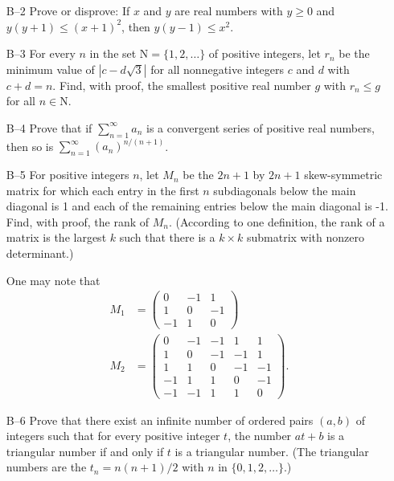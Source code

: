 \documentclass[amssymb,twocolumn,pra,10pt,aps]{revtex4-1}
\begin{document}
\begin{itemize}
\item[B--2]
Prove or disprove: If $x$ and $y$ are real numbers with $y\geq0$ and
$y(y+1) \leq (x+1)^2$, then $y(y-1)\leq x^2$.

\item[B--3]
For every $n$ in the set $\mathrm{N} = \{1,2,\dots \}$ of positive integers,
let $r_n$ be the minimum value of $|c-d\sqrt{3}|$ for all nonnegative
integers $c$ and $d$ with $c+d=n$. Find, with proof, the smallest
positive real number $g$ with $r_n \leq g$ for all $n \in \mathrm{N}$.

\item[B--4]
Prove that if $\sum_{n=1}^\infty a_n$ is a convergent series of
positive real numbers, then so is $\sum_{n=1}^\infty (a_n)^{n/(n+1)}$.

\item[B--5]
For positive integers $n$, let $M_n$ be the $2n+1$ by $2n+1$
skew-symmetric matrix for which each entry in the first $n$
subdiagonals below the main diagonal is 1 and each of the remaining
entries below the main diagonal is -1. Find, with proof, the rank of
$M_n$. (According to one definition, the rank of a matrix is the
largest $k$ such that there is a $k \times k$ submatrix with nonzero
determinant.)

One may note that
\begin{align*}
M_1 &= \left( \begin{array}{ccc} 0 & -1 & 1 \\ 1 & 0 & -1 \\ -1 & 1 & 0
\end{array}\right) \\
M_2 &= \left( \begin{array}{ccccc} 0 & -1 & -1 & 1
& 1 \\ 1 & 0 & -1 & -1 & 1 \\ 1 & 1 & 0 & -1 & -1 \\ -1 & 1 & 1 & 0 &
-1 \\ -1 & -1 & 1 & 1 & 0 \end{array} \right).
\end{align*}

\item[B--6]
Prove that there exist an infinite number of ordered pairs $(a,b)$ of
integers such that for every positive integer $t$, the number $at+b$
is a triangular number if and only if $t$ is a triangular number. (The
triangular numbers are the $t_n = n(n+1)/2$ with $n$ in $\{0,1,2,\dots\}$.)

\end{itemize}
\end{document}

